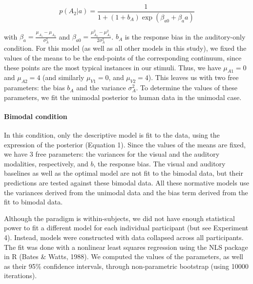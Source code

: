 \documentclass[english,,man,floatsintext]{apa6}
\let\oldparagraph\paragraph
\renewcommand{\paragraph}[1]{\oldparagraph{#1}\mbox{}}
\theoremstyle{definition}
\theoremstyle{definition}
\theoremstyle{definition}
\theoremstyle{remark}
\begin{document}
\[p(A_2 | a)=\frac{1}{1+(1+b_A)\exp(\beta_{a0}+\beta_aa)}\]

with \(\beta_a=\frac{\mu_{A_1}-\mu_{A_2}}{\sigma^2_{A}}\) and
\(\beta_{a0}=\frac{\mu^2_{A_2}-\mu^2_{A_1}}{2\sigma^2_{A}}\). \(b_A\) is
the response bias in the auditory-only condition. For this model (as
well as all other models in this study), we fixed the values of the
means to be the end-points of the corresponding continuum, since these
points are the most typical instances in our stimuli. Thus, we have
\(\mu_{A1}=0\) and \(\mu_{A2}=4\) (and similarly \(\mu_{V1}=0\), and
\(\mu_{V2}=4\)). This leaves us with two free parameters: the bias
\(b_A\) and the variance \(\sigma^2_{A}\). To determine the values of
these parameters, we fit the unimodal posterior to human data in the
unimodal case.

\paragraph{Bimodal condition}\label{bimodal-condition}

In this condition, only the descriptive model is fit to the data, using
the expression of the posterior (Equation 1). Since the values of the
means are fixed, we have 3 free parameters: the variances for the visual
and the auditory modalities, respectively, and \(b\), the response bias.
The visual and auditory baselines as well as the optimal model are not
fit to the bimodal data, but their predictions are tested against these
bimodal data. All these normative models use the variances derived from
the unimodal data and the bias term derived from the fit to bimodal
data.

Although the paradigm is within-subjects, we did not have enough
statistical power to fit a different model for each individual
participant (but see Experiment 4). Instead, models were constructed
with data collapsed across all participants. The fit was done with a
nonlinear least squares regression using the NLS package in R (Bates \&
Watts, 1988). We computed the values of the parameters, as well as their
95\% confidence intervals, through non-parametric bootstrap (using 10000
iterations).
\end{document}
